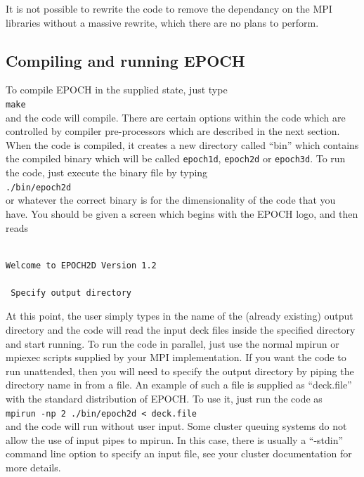 \documentclass[12pt]{article}
\begin{document}
It is not possible to rewrite the code to remove the dependancy on the MPI libraries without a massive rewrite, which there are no plans to perform.

\subsection{Compiling and running EPOCH}

To compile EPOCH in the supplied state, just type\\
\texttt{make}\\
and the code will compile. There are certain options within the code which are controlled by compiler pre-processors which are described in the next section. When the code is compiled, it creates a new directory called ``bin'' which contains the compiled binary which will be called \texttt{epoch1d}, \texttt{epoch2d} or \texttt{epoch3d}. To run the code, just execute the binary file by typing\\
\texttt{./bin/epoch2d}\\
or whatever the correct binary is for the dimensionality of the code that you have. You should be given a screen which begins with the EPOCH logo, and then reads\\

\begin{verbatim}

Welcome to EPOCH2D Version 1.2

 Specify output directory

\end{verbatim}

At this point, the user simply types in the name of the (already existing) output directory and the code will read the input deck files inside the specified directory and start running. To run the code in parallel, just use the normal mpirun or mpiexec scripts supplied by your MPI implementation. If you want the code to run unattended, then you will need to specify the output directory by piping the directory name in from a file. An example of such a file is supplied as ``deck.file'' with the standard distribution of EPOCH. To use it, just run the code as\\
\texttt{mpirun -np 2 ./bin/epoch2d < deck.file}\\
and the code will run without user input. Some cluster queuing systems do not allow the use of input pipes to mpirun. In this case, there is usually a ``-stdin'' command line option to specify an input file, see your cluster documentation for more details.
\end{document}
